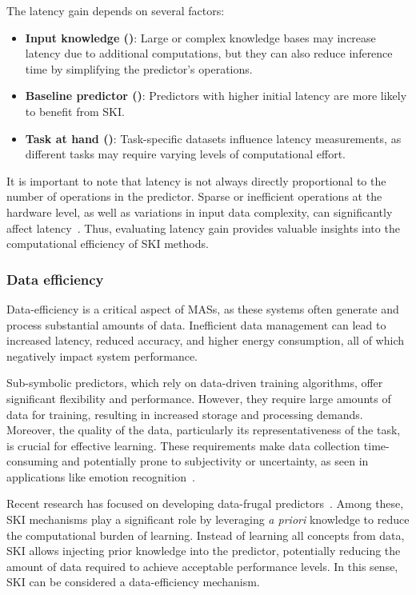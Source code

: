 %
The latency gain depends on several factors:
%
\begin{itemize}
    \item \textbf{Input knowledge ()}: Large or complex knowledge bases may increase latency due to additional computations, but they can also reduce inference time by simplifying the predictor's operations.
    \item \textbf{Baseline predictor ()}: Predictors with higher initial latency are more likely to benefit from \gls{SKI}.
    \item \textbf{Task at hand ()}: Task-specific datasets influence latency measurements, as different tasks may require varying levels of computational effort.
\end{itemize}

%
It is important to note that latency is not always directly proportional to the number of operations in the predictor.
%
Sparse or inefficient operations at the hardware level, as well as variations in input data complexity, can significantly affect latency~\cite{shumailov_sponge_2021}.
%
Thus, evaluating latency gain provides valuable insights into the computational efficiency of \gls{SKI} methods.


\subsubsection{Data efficiency}\label{subsubsec:ski-meets-intelligent-agents-data-efficiency}
%
Data-efficiency is a critical aspect of \glspl{MAS}, as these systems often generate and process substantial amounts of data.
%
Inefficient data management can lead to increased latency, reduced accuracy, and higher energy consumption, all of which negatively impact system performance.

%
Sub-symbolic predictors, which rely on data-driven training algorithms, offer significant flexibility and performance.
%
However, they require large amounts of data for training, resulting in increased storage and processing demands.
%
Moreover, the quality of the data, particularly its representativeness of the task, is crucial for effective learning.
%
These requirements make data collection time-consuming and potentially prone to subjectivity or uncertainty, as seen in applications like emotion recognition~\cite{deng_survey_2021}.

%
Recent research has focused on developing data-frugal predictors~\cite{sanchez_tinyml_2020}.
%
Among these, \gls{SKI} mechanisms play a significant role by leveraging \emph{a priori} knowledge to reduce the computational burden of learning.
%
Instead of learning all concepts from data, \gls{SKI} allows injecting prior knowledge into the predictor, potentially reducing the amount of data required to achieve acceptable performance levels.
%
In this sense, \gls{SKI} can be considered a data-efficiency mechanism.

